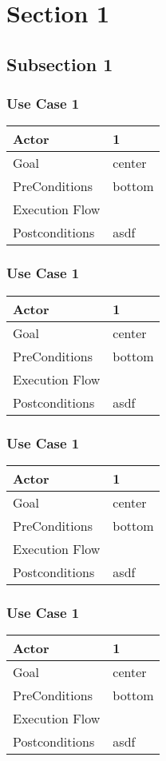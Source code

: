 \documentclass{article}
\begin{document}
	\section{Section 1}
	\subsection{Subsection 1}
	\subsubsection{Use Case 1}
	\begin{tabularx}{\textwidth}{  l  X  }
		\hline
		Actor & 1\\
		\hline
		Goal & center\\
		\hline
		PreConditions & bottom\\
		\hline
		Execution Flow & \\
		\hline
		Postconditions & asdf \\
		\hline
	\end{tabularx}
	\subsubsection{Use Case 1}
	\begin{tabularx}{\textwidth}{  l  X  }
		\hline
		Actor & 1\\
		\hline
		Goal & center\\
		\hline
		PreConditions & bottom\\
		\hline
		Execution Flow & \\
		\hline
		Postconditions & asdf \\
		\hline
	\end{tabularx}
	\subsubsection{Use Case 1}
	\begin{tabularx}{\textwidth}{  l  X  }
		\hline
		Actor & 1\\
		\hline
		Goal & center\\
		\hline
		PreConditions & bottom\\
		\hline
		Execution Flow & \\
		\hline
		Postconditions & asdf \\
		\hline
	\end{tabularx}
	\subsubsection{Use Case 1}
	\begin{tabularx}{\textwidth}{  l  X  }
		\hline
		Actor & 1\\
		\hline
		Goal & center\\
		\hline
		PreConditions & bottom\\
		\hline
		Execution Flow & \\
		\hline
		Postconditions & asdf \\
		\hline
	\end{tabularx}
\end{document}

